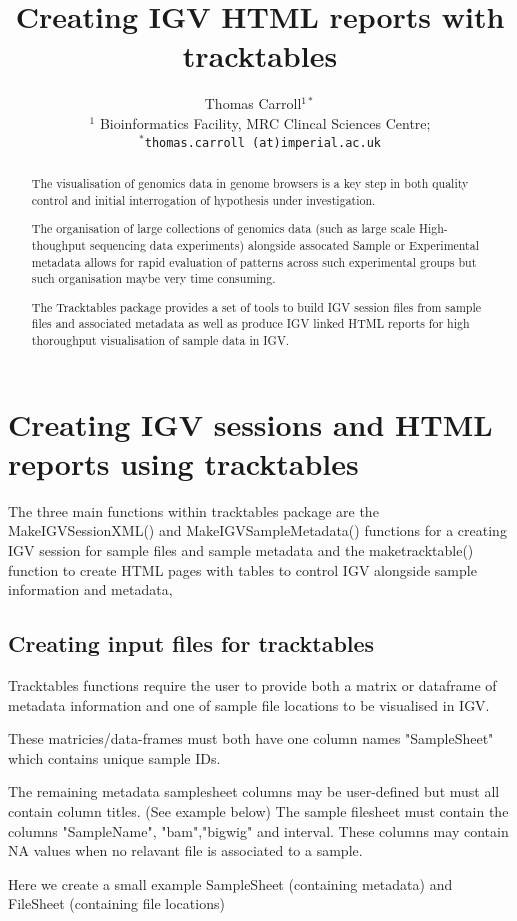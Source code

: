 \documentclass[12pt]{article}
\author{Thomas Carroll$^{1*}$\\[1em] \small{$^{1}$ Bioinformatics Facility, MRC Clincal Sciences Centre;} \\ \small{\texttt{$^*$thomas.carroll (at)imperial.ac.uk}}}
\title{Creating IGV HTML reports with tracktables}
\begin{document}
\maketitle

\begin{abstract}
 
The visualisation of genomics data in genome browsers is a key step in both quality control and initial interrogation of hypothesis under investigation. 

The organisation of large collections of genomics data (such as large scale High-thoughput sequencing data experiments) alongside assocated Sample or Experimental metadata allows for rapid evaluation of patterns across such experimental groups but such organisation maybe very time consuming.

 The Tracktables package provides a set of tools to build IGV session files from sample files and associated metadata as well as produce IGV linked HTML reports for high thoroughput visualisation of sample data in IGV.
 
  \vspace{1em}
  
  \end{abstract}



\newpage

\tableofcontents

\section{Creating IGV sessions and HTML reports using tracktables}

The three main functions within tracktables package are the MakeIGVSessionXML() and  MakeIGVSampleMetadata() functions for a creating IGV session for sample files and sample metadata and the maketracktable() function to create HTML pages with tables to control IGV alongside sample information and metadata,

\subsection{Creating input files for tracktables}

Tracktables functions require the user to provide both a matrix or dataframe of metadata information and one of sample file locations to be visualised in IGV. 

These matricies/data-frames must both have one column names "SampleSheet" which contains unique sample IDs.

The remaining metadata samplesheet columns may be user-defined but must all contain column titles. (See example below)
The sample filesheet must contain the columns "SampleName", "bam","bigwig" and interval. These columns may contain NA values when no relavant file is associated to a sample.

Here we create a small example SampleSheet (containing metadata) and FileSheet (containing file locations)
\end{document}
